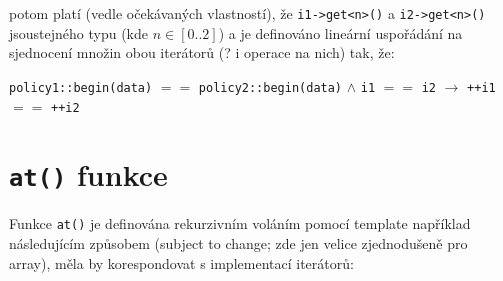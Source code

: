 \documentclass[a4paper,12pt]{article}
\begin{document}
    potom platí (vedle očekávaných vlastností), že \lstinline{i1->get<n>()} a \lstinline{i2->get<n>()} jsou\linebreak stejného typu (kde $n \in [0..2]$) a je definováno lineární uspořádání na sjednocení množin obou iterátorů (? i operace na nich) tak, že:

    \begin{center}
        \lstinline{policy1::begin(data)} $==$ \lstinline{policy2::begin(data)} $\wedge$
    \lstinline{i1} $==$ \lstinline{i2} $\to$ \lstinline{++i1} $==$ \lstinline{++i2}
    \end{center}

    \section{\lstinline{at()} funkce}

    Funkce \lstinline{at()} je definována rekurzivním voláním pomocí template například následujícím způsobem (subject to change; zde jen velice zjednodušeně pro array), měla by korespondovat s implementací iterátorů:
    
\end{document}
